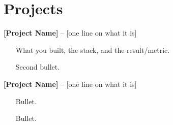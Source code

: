 \documentclass[a4paper,10pt]{article}
\begin{document}
\section*{Projects}
\textbf{[Project Name]} -- [one line on what it is]
\begin{itemize}[leftmargin=*, itemsep=0pt]
  \item [What you built, the stack, and the result/metric.]
  \item [Second bullet.]
\end{itemize}

\textbf{[Project Name]} -- [one line on what it is]
\begin{itemize}[leftmargin=*, itemsep=0pt]
  \item [Bullet.]
  \item [Bullet.]
\end{itemize}
\end{document}
